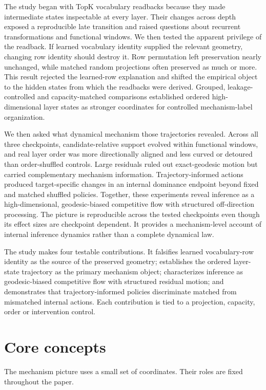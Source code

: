 \documentclass[11pt]{article}
\begin{document}
The study began with TopK vocabulary readbacks because they made intermediate states inspectable at every layer. Their changes across depth exposed a reproducible late transition and raised questions about recurrent transformations and functional windows. We then tested the apparent privilege of the readback. If learned vocabulary identity supplied the relevant geometry, changing row identity should destroy it. Row permutation left preservation nearly unchanged, while matched random projections often preserved as much or more. This result rejected the learned-row explanation and shifted the empirical object to the hidden states from which the readbacks were derived. Grouped, leakage-controlled and capacity-matched comparisons established ordered high-dimensional layer states as stronger coordinates for controlled mechanism-label organization.

We then asked what dynamical mechanism those trajectories revealed. Across all three checkpoints, candidate-relative support evolved within functional windows, and real layer order was more directionally aligned and less curved or detoured than order-shuffled controls. Large residuals ruled out exact-geodesic motion but carried complementary mechanism information. Trajectory-informed actions produced target-specific changes in an internal dominance endpoint beyond fixed and matched shuffled policies. Together, these experiments reveal inference as a high-dimensional, geodesic-biased competitive flow with structured off-direction processing. The picture is reproducible across the tested checkpoints even though its effect sizes are checkpoint dependent. It provides a mechanism-level account of internal inference dynamics rather than a complete dynamical law.

The study makes four testable contributions. It falsifies learned vocabulary-row identity as the source of the preserved geometry; establishes the ordered layer-state trajectory as the primary mechanism object; characterizes inference as geodesic-biased competitive flow with structured residual motion; and demonstrates that trajectory-informed policies discriminate matched from mismatched internal actions. Each contribution is tied to a projection, capacity, order or intervention control.

\section*{Core concepts}
The mechanism picture uses a small set of coordinates. Their roles are fixed throughout the paper.
\end{document}
